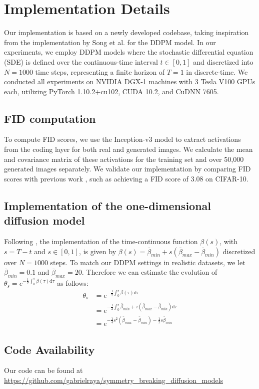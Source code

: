 \section{Implementation Details}
\label{supp:implementation_details}

Our implementation is based on a newly developed codebase, taking inspiration from the implementation by Song et al. \cite{song2021scorebased} for the DDPM model. In our experiments, we employ DDPM models where the stochastic differential equation (SDE) is defined over the continuous-time interval $t\in [0,1]$ and discretized into $N=1000$ time steps, representing a finite horizon of $T=1$ in discrete-time. We conducted all experiments on NVIDIA DGX-1 machines with 3 Tesla V100 GPUs each, utilizing PyTorch 1.10.2+cu102, CUDA 10.2, and CuDNN 7605.

\subsection{FID computation}

To compute FID scores, we use the Inception-v3 model to extract activations from the coding layer for both real and generated images.
We calculate the mean and covariance matrix of these activations for the training set and over 50,000 generated images separately.
We validate our implementation by comparing FID scores with previous work \cite{ho2020denoising, song2021scorebased}, such as achieving a FID score of 3.08 on CIFAR-10.



\subsection{Implementation of the one-dimensional diffusion model}

Following \cite{song2021scorebased}, the implementation of the time-continuous function $\beta(s)$, with $s=T-t$ and $s\in[0,1]$, is given by $\beta(s)=\bar{\beta}_{min} + s(\bar{\beta}_{max}- \bar{\beta}_{min})$  discretized over $N=1000$ steps.  To match our DDPM settings in realistic datasets, we let  $\bar{\beta}_{min}=0.1$ and $\bar{\beta}_{max}=20$. Therefore we can estimate the evolution of $\theta_s = e^{-\frac{1}{2} \int_0^s \beta(\tau) \text{d} \tau}$ as follows:
\begin{align*}
    \theta_s &= e^{-\frac{1}{2} \int_0^s \beta(\tau) \text{d} \tau} \\
             &= e^{-\frac{1}{2} \int_0^s \bar{\beta}_{min} + \tau(\bar{\beta}_{max}- \bar{\beta}_{min})\text{d} \tau} \\
             &= e^{-\frac{1}{4}s^2(\bar{\beta}_{max}- \bar{\beta}_{min})-\frac{1}{2}s \bar{\beta}_{min}}
\end{align*}


\subsection{Code Availability}

Our code can be found at \href{https://github.com/gabrielraya/symmetry_breaking_diffusion_models}{https://github.com/gabrielraya/symmetry\_breaking\_diffusion\_models}